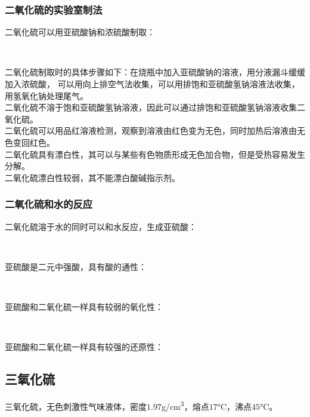 \documentclass[UTF8]{ctexart}
\begin{document}
\newpage

\subsubsection{二氧化硫的实验室制法}
    二氧化硫可以用亚硫酸钠和浓硫酸制取：
    \begin{center}
        \\[6mm]
    \end{center}
    二氧化硫制取时的具体步骤如下：在烧瓶中加入亚硫酸钠的溶液，用分液漏斗缓缓加入浓硫酸，
    可以用向上排空气法收集，可以用排饱和亚硫酸氢钠溶液法收集，用氢氧化钠处理尾气。\\[3mm]
    二氧化硫不溶于饱和亚硫酸氢钠溶液，因此可以通过排饱和亚硫酸氢钠溶液收集二氧化硫。\\[3mm]
    二氧化硫可以用品红溶液检测，观察到溶液由红色变为无色，同时加热后溶液由无色变回红色。\\[3mm]
    二氧化硫具有漂白性，其可以与某些有色物质形成无色加合物，但是受热容易发生分解。\\[3mm]
    二氧化硫漂白性较弱，其不能漂白酸碱指示剂。

\subsubsection{二氧化硫和水的反应}
    二氧化硫溶于水的同时可以和水反应，生成亚硫酸：
    \begin{center}
        \\[4mm]
    \end{center}
    亚硫酸是二元中强酸，具有酸的通性：
    \begin{center}
        \\[4mm]
    \end{center}
    亚硫酸和二氧化硫一样具有较弱的氧化性：
    \begin{center}
        \\[4mm]
    \end{center}
    亚硫酸和二氧化硫一样具有较强的还原性：
    \begin{center}
    \end{center}

\subsection{三氧化硫}
    三氧化硫，无色刺激性气味液体，密度$1.97$\si{g/cm^3}，熔点$17$\si{\degreeCelsius}，沸点$45$\si{\degreeCelsius}。
\end{document}
